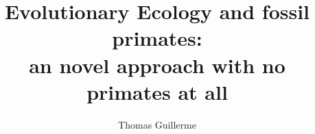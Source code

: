 \documentclass[twoside,12pt]{header/thesistemplate} %
\title{Evolutionary Ecology and fossil primates:\\%
  an novel approach with no primates at all}
\author{Thomas Guillerme}
\begin{document}
\maketitle %




\allcontents %

\cleardoublepage

\mainbody



	

\formatbibliography 




\formatappendices

\end{document}
